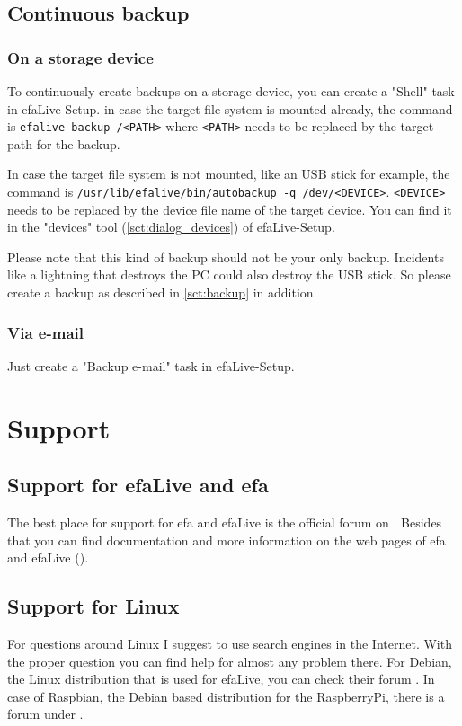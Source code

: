\documentclass[a4paper,12pt,twoside]{article}
\begin{document}
\subsection{Continuous backup}
\label{sct:cont_backup}
\subsubsection{On a storage device}
\label{sct:cont_device}
To continuously create backups on a storage device, you can create a "Shell" task
in efaLive-Setup. in case the target file system is mounted already, the command is 
\texttt{efalive-backup /{\textless}PATH{\textgreater}} where 
\texttt{{\textless}PATH{\textgreater}} needs to be replaced by the 
target path for the backup.

In case the target file system is not mounted, like an USB stick for example, the 
command is \texttt{/usr/lib/efalive/bin/autobackup -q /dev/{\textless}DEVICE{\textgreater}}.
\texttt{{\textless}DEVICE{\textgreater}} needs 
to be replaced by the device file name of the target device. You can find it in the 
"devices" tool (\ref{sct:dialog_devices}) of efaLive-Setup.

Please note that this kind of backup should not be your only backup.
Incidents like a lightning that destroys the PC could also destroy the
USB stick. So please create a backup as described in \ref{sct:backup} in addition.

\subsubsection{Via e-mail}
\label{sct:cont_mail}
Just create a "Backup e-mail" task in efaLive-Setup.


\section{Support}
\label{sct:support}
\subsection{Support for efaLive and efa}
\label{sct:support_efa}
The best place for support for efa and efaLive is the official forum on
\cite{EFA3}. Besides that you can find documentation and more
information on the web pages of efa and efaLive
(\cite{EFA1}\cite{EFA4}\cite{EFA5}).


\subsection{Support for Linux}
\label{support_linux}
For questions around Linux I suggest to use search engines in the
Internet. With the proper question you can find help for almost any
problem there. For Debian, the Linux distribution that is used for
efaLive, you can check their forum \cite{HLP1}. In case of Raspbian, 
the Debian based distribution for the RaspberryPi, there is a forum 
under \cite{RSP1}.
\end{document}
